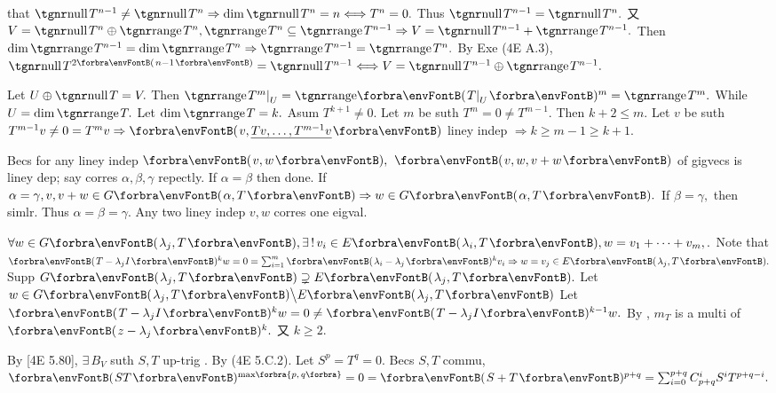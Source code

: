 \NOTICE that $\null T^{n-1}\neq\null T^n\Rightarrow\dim\null T^n=n\Longleftrightarrow T^n=0.$ Thus $\null T^{n-1}=\null T^n.$\parSol{}
又 $V=\null T^n\oplus\range T^n,\range T^n\subseteq\range T^{n-1}\Rightarrow V=\null T^{n-1}+\range T^{n-1}.$\PfEnd\parSol{}
\Or Then $\dim\range T^{n-1}=\dim\range T^n\Rightarrow\range T^{n-1}=\range T^n.$\PfEnd\vspace{2pt}\parSol{}
\Or By Exe (4E A.3), $\null T^{2\SmallPar{n-1}}=\null T^{n-1}\Longleftrightarrow V=\null T^{n-1}\oplus\range T^{n-1}.$\PfEnd
\SepLine

Let $U\oplus\null T=V.$ Then $\range T^m\mmid_U=\Range\Par{T\mmid_U}{^m}=\range T^m.$ While $U=\dim\range T.$\PfEnd\parSol{}
\Or Let $\dim\range T=k.$ Asum $T^{k+1}\neq 0.$ Let $m$ be suth $T^m=0\neq T^{m-1}.$ Then $k+2\leqslant m.$\parSol{}
Let $v$ be suth $T^{m-1}v\neq 0=T^mv\Rightarrow\Par{v,{}$\uline{$Tv,\dots,T^{m-1}v$}$}$ liney indep $\Rightarrow k\geqslant m-1\geqslant k+1.$\PfEnd
\SepLine

Becs for any liney indep $\Par{v,w},$ $\Par{v,w,v+w}$ of gigvecs is liney dep; say corres $\alpha,\beta,\gamma$ repectly.\parSol{}
If $\alpha=\beta$ then done. If $\alpha=\gamma,v,v+w\in G\Par{\alpha,T}\Rightarrow w\in G\Par{\alpha,T}.$ If $\beta=\gamma,$ then simlr.\parSol{}
Thus $\alpha=\beta=\gamma.$ Any two liney indep $v,w$ corres one eigval.\PfEndB
\SepLine

$\forall w\in G\Par{\lambda_j,T},\exists\,!\,v_i\in E\Par{\lambda_i,T},w=v_1+\dots+v_m,.$\parSol{}
Note that $\Par{T-\lambda_jI}{^k}w=0=\sum_{i=1}^m\Par{\lambda_i-\lambda_j}{^k}v_i\Rightarrow w=v_j\in E\Par{\lambda_j,T}.$\PfEnd\vspace{3pt}\parSol{}
\Or Supp $G\Par{\lambda_j,T}\supsetneq E\Par{\lambda_j,T}.$ Let $w\in G\Par{\lambda_j,T}\Backslash E\Par{\lambda_j,T}$\parSol{}
Let $\Par{T-\lambda_jI}{^k}w=0\neq\Par{T-\lambda_jI}{^{k-1}}w.$ By , $m_T$ is a multi of $\Par{z-\lambda_j}{^k}.$ 又 $k\geqslant 2.$\PfEnd
\SepLine

By [4E 5.80], $\exists\,B_V$ suth $S,T$ up-trig . By (4E 5.C.2).\PfEnd\vspace{2pt}\parSol{}
\Or Let $S^p=T^q=0.$ Becs $S,T$ commu, $\Par{ST}{^{\max\!\Bra[\scriptsize]{p,\,q}}}=0=\Par{S+T}{^{p+q}}=\sum_{i=0}^{p+q}\mathC_{p+q}^iS^iT^{p+q-i}.$\PfEndB
\SepLine

